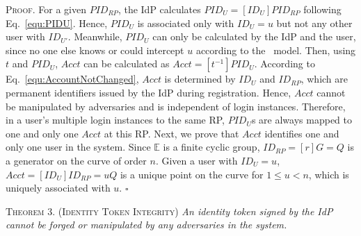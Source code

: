 \vspace{0.75mm}
\noindent\textsc{Proof.}
For a given $PID_{RP}$, the IdP calculates $PID_U = [ID_U]PID_{RP}$ following Eq.~\ref{equ:PIDU}. Hence, $PID_U$ is associated only with $ID_U=u$ but not any other user with $ID_{U'}$. Meanwhile, $PID_U$ can only be calculated by the IdP and the user, since no one else knows or could intercept $u$ according to the \dy~model. \oldc
Then, using $t$ and $PID_U$, $Acct$ can be calculated as $Acct = [t^{-1}]PID_{U}$. %
According to Eq.~\ref{equ:AccountNotChanged}, $Acct$ is determined by $ID_U$ and $ID_{RP}$, which are permanent identifiers issued by the IdP during registration. Hence, $Acct$ cannot be manipulated by adversaries and is independent of login instances. Therefore, in a user's multiple login instances to the same RP, $PID_U$s are always mapped to one and only one $Acct$ at this RP. Next, we prove that $Acct$ identifies one and only one user in the system. Since $\mathbb{E}$ is a finite cyclic group, $ID_{RP} = [r]G = Q$ is a generator on the curve of order $n$. Given a user with $ID_U = u$, $Acct = [ID_U]ID_{RP} = uQ$ is a unique point on the curve for $1 \leq u < n$, which is uniquely associated with $u$. \hfill $\square$



\newc
\vspace{1mm}
\noindent\textsc{Theorem 3. (Identity Token Integrity)} {\em An identity token signed by the IdP cannot be forged or manipulated by any adversaries in the system.}


